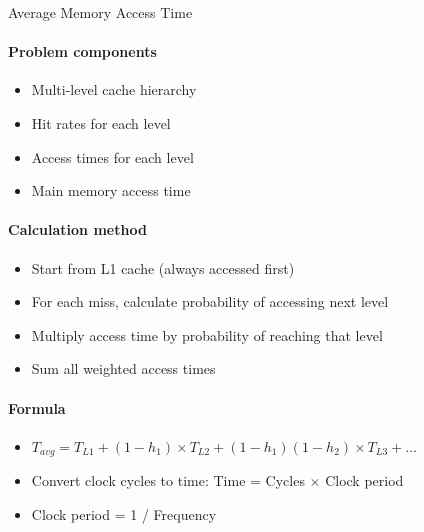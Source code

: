 \begin{KR}{Average Memory Access Time}
    \paragraph{Problem components}
    \begin{itemize}
        \item Multi-level cache hierarchy
        \item Hit rates for each level
        \item Access times for each level
        \item Main memory access time
    \end{itemize}
    
    \paragraph{Calculation method}
    \begin{itemize}
        \item Start from L1 cache (always accessed first)
        \item For each miss, calculate probability of accessing next level
        \item Multiply access time by probability of reaching that level
        \item Sum all weighted access times
    \end{itemize}
    
    \paragraph{Formula}
    \begin{itemize}
        \item $T_{avg} = T_{L1} + (1-h_1) \times T_{L2} + (1-h_1)(1-h_2) \times T_{L3} + \ldots$
        \item Convert clock cycles to time: Time = Cycles $\times$ Clock period
        \item Clock period = 1 / Frequency
    \end{itemize}
\end{KR}

